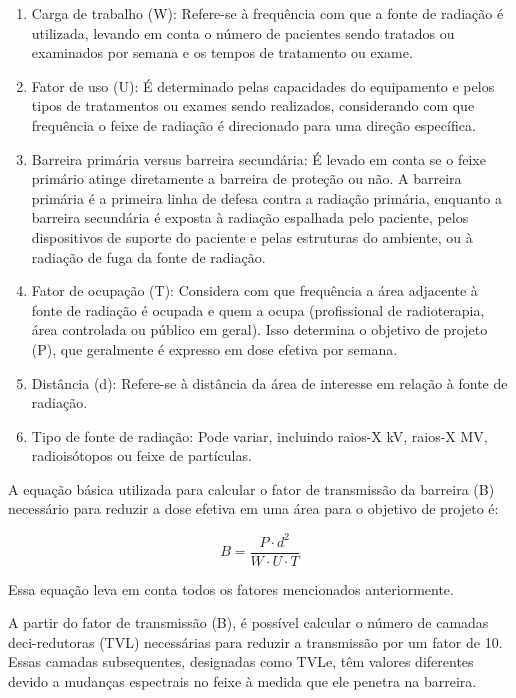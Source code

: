 \documentclass[11pt,a4paper]{article}
\begin{document}
	\begin{enumerate}
		\item Carga de trabalho (W): Refere-se à frequência com que a fonte de radiação é utilizada, levando em conta o número de pacientes sendo tratados ou examinados por semana e os tempos de tratamento ou exame.
		\item Fator de uso (U): É determinado pelas capacidades do equipamento e pelos tipos de tratamentos ou exames sendo realizados, considerando com que frequência o feixe de radiação é direcionado para uma direção específica.
		\item Barreira primária versus barreira secundária: É levado em conta se o feixe primário atinge diretamente a barreira de proteção ou não. A barreira primária é a primeira linha de defesa contra a radiação primária, enquanto a barreira secundária é exposta à radiação espalhada pelo paciente, pelos dispositivos de suporte do paciente e pelas estruturas do ambiente, ou à radiação de fuga da fonte de radiação.
		\item Fator de ocupação (T): Considera com que frequência a área adjacente à fonte de radiação é ocupada e quem a ocupa (profissional de radioterapia, área controlada ou público em geral). Isso determina o objetivo de projeto (P), que geralmente é expresso em dose efetiva por semana.
		\item Distância (d): Refere-se à distância da área de interesse em relação à fonte de radiação.
		\item Tipo de fonte de radiação: Pode variar, incluindo raios-X kV, raios-X MV, radioisótopos ou feixe de partículas.
	\end{enumerate}

	A equação básica utilizada para calcular o fator de transmissão da barreira (B) necessário para reduzir a dose efetiva em uma área para o objetivo de projeto é:
	
	\begin{equation}
		B = \frac{P \cdot d^2}{W \cdot U \cdot T}
	\end{equation}
	
	Essa equação leva em conta todos os fatores mencionados anteriormente.

	A partir do fator de transmissão (B), é possível calcular o número de camadas deci-redutoras (TVL) necessárias para reduzir a transmissão por um fator de 10. Essas camadas subsequentes, designadas como TVLe, têm valores diferentes devido a mudanças espectrais no feixe à medida que ele penetra na barreira.
\end{document}
